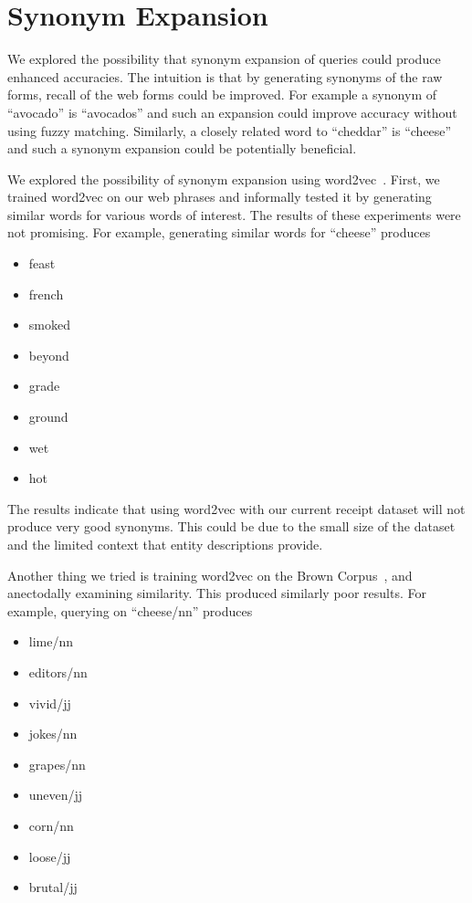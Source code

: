 \documentclass[11pt,a4paper]{article}
\newenvironment{myitemize}
{ \begin{itemize}
    \setlength{\itemsep}{0pt}
    \setlength{\parskip}{0pt}
    \setlength{\parsep}{0pt}     }
{ \end{itemize}                  }
\begin{document}
\section{Synonym Expansion}
We explored the possibility that synonym expansion of queries
could produce enhanced accuracies.  The intuition is that by
generating synonyms of the raw forms, recall of the web forms
could be improved.  For example a synonym of ``avocado'' is
``avocados'' and such an expansion could improve accuracy without
using fuzzy matching.  Similarly, a closely related word to
``cheddar'' is ``cheese'' and such a synonym expansion could be
potentially beneficial.

We explored the possibility of synonym expansion using
word2vec~\cite{NIPS2013_5021}.  First, we trained word2vec on our web
phrases and informally tested it by generating similar words for
various words of interest.  The results of these experiments were
not promising.  For example, generating similar words for
``cheese'' produces
\begin{myitemize}
\item feast
\item french
\item smoked
\item beyond
\item grade
\item ground
\item wet
\item hot
\end{myitemize}  

The results indicate that using word2vec with our current receipt
dataset will not produce very good synonyms.  This could be due
to the small size of the dataset and the limited context that
entity descriptions provide.

Another thing we tried is training word2vec on the Brown
Corpus~\cite{francis79browncorpus}, and anectodally examining
similarity.  This produced similarly poor results.  For example,
querying on ``cheese/nn'' produces
\begin{myitemize}
\item lime/nn
\item editors/nn
\item vivid/jj
\item jokes/nn
\item grapes/nn
\item uneven/jj
\item corn/nn
\item loose/jj
\item brutal/jj
\end{myitemize}  
\end{document}
